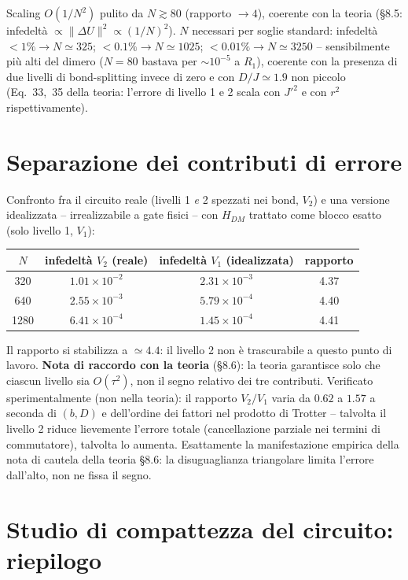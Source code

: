 \documentclass[11pt,a4paper]{article}
\begin{document}
Scaling $O(1/N^2)$ pulito da $N\gtrsim80$ (rapporto $\to4$), coerente con
la teoria (\S8.5: infedeltà $\propto\|\Delta U\|^2\propto(1/N)^2$).
$N$ necessari per soglie standard: infedeltà $<1\%\to N\simeq325$;
$<0.1\%\to N\simeq1025$; $<0.01\%\to N\simeq3250$ -- sensibilmente più alti
del dimero ($N=80$ bastava per $\sim10^{-5}$ a $R_1$), coerente con la
presenza di due livelli di bond-splitting invece di zero e con $D/J\simeq1.9$
non piccolo (Eq.~33,~35 della teoria: l'errore di livello 1 e 2 scala con
$J'^2$ e con $r^2$ rispettivamente).

\section{Separazione dei contributi di errore}

Confronto fra il circuito reale (livelli 1 \emph{e} 2 spezzati nei bond,
$V_2$) e una versione idealizzata -- irrealizzabile a gate fisici -- con
$H_{DM}$ trattato come blocco esatto (solo livello 1, $V_1$):

\begin{center}
\begin{tabular}{@{}cccc@{}}
\toprule
$N$ & infedeltà $V_2$ (reale) & infedeltà $V_1$ (idealizzata) & rapporto \\
\midrule
320 & $1.01\times10^{-2}$ & $2.31\times10^{-3}$ & 4.37 \\
640 & $2.55\times10^{-3}$ & $5.79\times10^{-4}$ & 4.40 \\
1280 & $6.41\times10^{-4}$ & $1.45\times10^{-4}$ & 4.41 \\
\bottomrule
\end{tabular}
\end{center}

Il rapporto si stabilizza a $\simeq4.4$: il livello 2 non è trascurabile
a questo punto di lavoro. \textbf{Nota di raccordo con la teoria} (\S8.6):
la teoria garantisce solo che ciascun livello sia $O(\tau^2)$, non il
segno relativo dei tre contributi. Verificato sperimentalmente (non nella
teoria): il rapporto $V_2/V_1$ varia da $0.62$ a $1.57$ a seconda di
$(b,D)$ e dell'ordine dei fattori nel prodotto di Trotter -- talvolta il
livello 2 riduce lievemente l'errore totale (cancellazione parziale nei
termini di commutatore), talvolta lo aumenta. Esattamente la
manifestazione empirica della nota di cautela della teoria \S8.6: la
disuguaglianza triangolare limita l'errore dall'alto, non ne fissa il
segno.

\section{Studio di compattezza del circuito: riepilogo}
\end{document}
